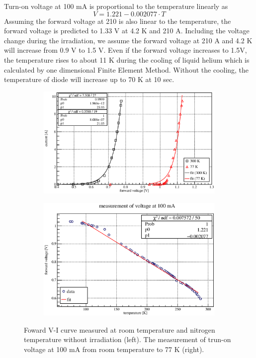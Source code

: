 Turn-on voltage at 100 mA is proportional to the temperature linearly as
\begin{equation}
 V = 1.221 - 0.002077 \cdot T
\end{equation}
Assuming the forward voltage at 210 is also linear to the temperature, the forward voltage is predicted to 1.33 V at 4.2 K and 210 A.
Including the voltage change during the irradiation, we assume the forward voltage at 210 A and 4.2 K will increase from 0.9 V to 1.5 V.
Even if the forward voltage increases to 1.5V, the temperature rises to about 11 K during the cooling of liquid helium which is calculated by one dimensional Finite Element Method.
Without the cooling, the temperature of diode will increase up to 70 K at 10 sec.
 \begin{figure}[H]
  \begin{subfigure}{0.3\textwidth}
   \centering
   \includegraphics[scale=0.43]{chapter4/fig/cryo.eps}
  \end{subfigure}
  \hspace{0.2\textwidth}
  \begin{subfigure}{0.3\textwidth}
   \centering
   \includegraphics[scale=0.43]{chapter4/fig/temp.eps}
  \end{subfigure}
  \caption{Foward V-I curve measured at room temperature and nitrogen temperature without irradiation (left). The measurement of trun-on voltage at 100 mA from room temperature to 77 K (right).}
  \label{3cryo}
 \end{figure}

